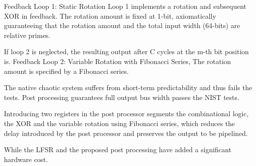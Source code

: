  Feedback Loop 1: Static Rotation Loop 1 implements a rotation and subsequent XOR in feedback. The rotation amount is fixed at 1-bit, axiomatically guaranteeing that the rotation amount and the total input width (64-bits) are relative primes. 
 
 If loop 2 is neglected, the resulting output after C cycles at the m-th bit position is. Feedback Loop 2: Variable Rotation with Fibonacci Series,  The rotation amount is specified by a Fibonacci series. 
 
 The native chaotic system suffers from short-term predictability and thus fails the tests. Post processing guarantees full output bus width passes the NIST tests. 
 
  Introducing two registers in the post processor segments the combinational logic, the XOR and the variable rotation using Fibonacci series, which reduces the delay introduced by the post processor and preserves the output to be pipelined. 
  
  While the LFSR and the proposed post processing have added a significant hardware cost.




